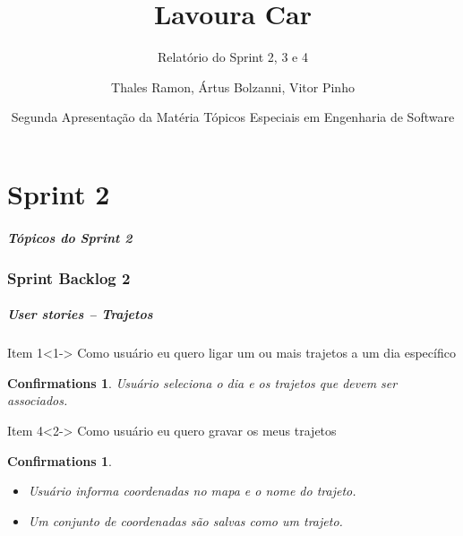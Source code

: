 \documentclass[hyperref={pdfpagelabels=false},11pt]{beamer}
\author{Thales Ramon, Ártus Bolzanni, Vitor Pinho}
\title{Lavoura Car}
\subtitle{Relatório do Sprint 2, 3 e  4}
\date[UNEB-SI 2010.2]{Segunda Apresentação da Matéria Tópicos Especiais em Engenharia de Software}
\institute[UNEB]{Universidade Estadual da Bahia}
\newtheorem{confirmations}[theorem]{Confirmations}
\begin{document}
	\begin{frame}
		\titlepage
	\end{frame}
	
	\part{Sprint 2}
		\begin{frame}
			\frametitle{Tópicos do Sprint 2}
			\tableofcontents[pausesections]
		\end{frame}
		
		\section{Sprint Backlog 2}
	
			\begin{frame}
				\frametitle{User stories -- Trajetos}
				\begin{block}{Item 1}<1->
					Como usuário eu quero ligar um ou mais trajetos a um dia específico
					
				\begin{confirmations}
						{Usuário seleciona o dia e os trajetos que devem ser associados.}
				\end{confirmations}	

				\end{block}
				\begin{block}{Item 4}<2->
					Como usuário eu quero gravar os meus trajetos
					
					\begin{confirmations}
						\begin{itemize}
							\item Usuário informa coordenadas no mapa e o nome do trajeto.
							\item Um conjunto de coordenadas são salvas como um trajeto.
						\end{itemize}
					\end{confirmations}
				\end{block} 								
			\end{frame}
			
\end{document}
